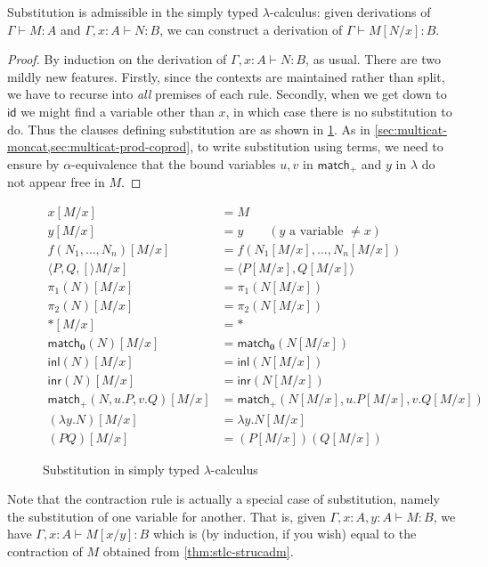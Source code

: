 \documentclass{book}
\def\idfunc{\mathsf{id}}
\let\types\vdash
\def\ttt{\mathord{\ast}}%
\def\pair#1#2{\langle #1,#2\rangle}
\def\inl{\mathsf{inl}}
\def\inr{\mathsf{inr}}
\def\case{\mathsf{match}_+}
\def\match{\mathsf{match}}
\def\zero{\mathbf{0}}
\def\abort{\match_{\zero}}
\begin{document}
\begin{lem}\label{thm:stlc-subadm}
  Substitution is admissible in the simply typed $\lambda$-calculus: given derivations of $\Gamma\types M:A$ and $\Gamma,x:A\types N:B$, we can construct a derivation of $\Gamma\types M[N/x]:B$.
\end{lem}
\begin{proof}
  By induction on the derivation of $\Gamma,x:A\types N:B$, as usual.
  There are two mildly new features.
  Firstly, since the contexts are maintained rather than split, we have to recurse into \emph{all} premises of each rule.
  Secondly, when we get down to $\idfunc$ we might find a variable other than $x$, in which case there is no substitution to do.
  Thus the clauses defining substitution are as shown in \cref{fig:stlc-sub}.
  As in \cref{sec:multicat-moncat,sec:multicat-prod-coprod}, to write substitution using terms, we need to ensure by $\alpha$-equivalence that the bound variables $u,v$ in $\case$ and $y$ in $\lambda$ do not appear free in $M$.
\end{proof}

\begin{figure}
  \centering
  \begin{align*}
    x[M/x] &= M \\
    y[M/x] &= y \qquad (y\text{ a variable } \neq x)\\
    f(N_1,\dots,N_n)[M/x] &= f(N_1[M/x],\dots,N_n[M/x])\\
    \pair{P,Q}[M/x] &= \pair{P[M/x]}{Q[M/x]}\\
    \pi_1(N)[M/x] &= \pi_1(N[M/x])\\
    \pi_2(N)[M/x] &= \pi_2(N[M/x])\\
    \ttt[M/x] &= \ttt\\
    \abort(N)[M/x] &= \abort(N[M/x])\\
    \inl(N)[M/x] &= \inl(N[M/x])\\
    \inr(N)[M/x] &= \inr(N[M/x])\\
    \case(N,u.P,v.Q)[M/x] &= \case(N[M/x],u.P[M/x],v.Q[M/x])\\
    (\lambda y.N)[M/x] &= \lambda y.N[M/x]\\
    (PQ)[M/x] &= (P[M/x])(Q[M/x])
  \end{align*}
  \caption{Substitution in simply typed $\lambda$-calculus}
  \label{fig:stlc-sub}
\end{figure}

Note that the contraction rule is actually a special case of substitution, namely the substitution of one variable for another.
That is, given $\Gamma,x:A,y:A \types M:B$, we have $\Gamma,x:A \types M[x/y]:B$ which is (by induction, if you wish) equal to the contraction of $M$ obtained from \cref{thm:stlc-strucadm}.
\end{document}
